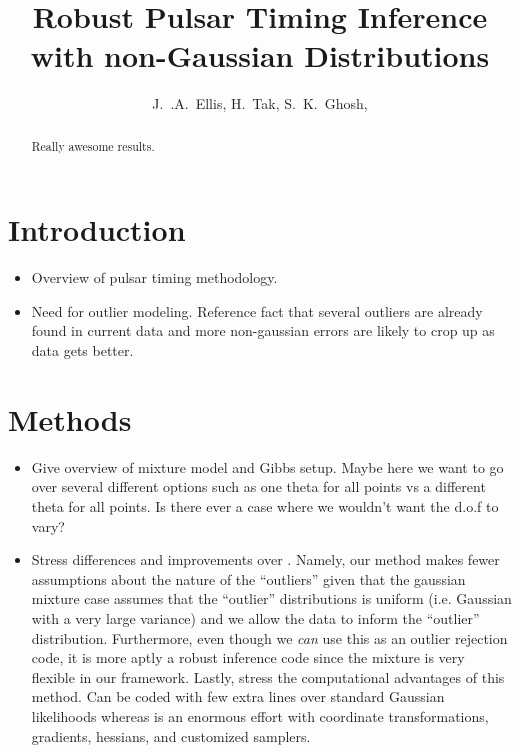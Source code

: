 \documentclass[iop,apj]{emulateapj}
\begin{document}
\title{Robust Pulsar Timing Inference with non-Gaussian Distributions}

\author{
J.~.A.~Ellis,
H.~Tak,
S.~K.~Ghosh,
}


\begin{abstract}
Really awesome results.
\end{abstract}

\section{Introduction}
\begin{itemize}
\item Overview of pulsar timing methodology.
\item Need for outlier modeling. Reference fact that several outliers are already found in current data and more non-gaussian errors are likely to crop up as data gets better.
\end{itemize}

\section{Methods}
\begin{itemize}
\item Give overview of mixture model and Gibbs setup. Maybe here we want to go over several different options such as one theta for all points vs a different theta for all points. Is there ever a case where we wouldn't want the d.o.f to vary?
\item Stress differences and improvements over \cite{vvh17}. Namely, our method makes fewer assumptions about the nature of the ``outliers'' given that the gaussian mixture case assumes that the ``outlier'' distributions is uniform (i.e. Gaussian with a very large variance) and we allow the data to inform the ``outlier'' distribution. Furthermore, even though we \emph{can} use this as an outlier rejection code, it is more aptly a robust inference code since the mixture is very flexible in our framework. Lastly, stress the computational advantages of this method. Can be coded with few extra lines over standard Gaussian likelihoods whereas \cite{vvh17} is an enormous effort with coordinate transformations, gradients, hessians, and customized samplers.
\end{itemize}
\end{document}

